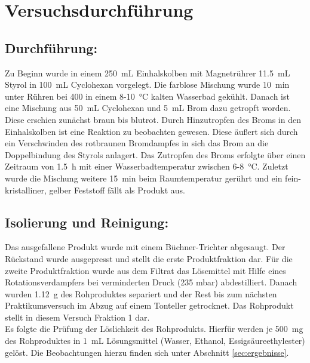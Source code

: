 \newpage
\section{Versuchsdurchführung}
\label{sec:durchfuerung}


\subsection*{Durchführung:}
Zu Beginn wurde in einem \SI{250}{\milli \liter} Einhalskolben mit Magnetrührer \SI{11,5}{\milli \liter} Styrol in \SI{100}{\milli \liter} Cyclohexan vorgelegt. Die farblose Mischung wurde \SI{10}{\minute} unter Rühren bei \SI{400}{\rpm} in einem 8-\SI{10}{\celsius} kalten Wasserbad gekühlt. Danach ist eine Mischung aus \SI{50}{\milli \liter} Cyclohexan und \SI{5}{\milli \liter} Brom dazu getropft worden. Diese erschien zunächst braun bis blutrot. Durch Hinzutropfen des Broms in den Einhalskolben ist eine Reaktion zu beobachten gewesen. Diese äußert sich durch ein Verschwinden des rotbraunen Bromdampfes in sich das Brom an die Doppelbindung des Styrols anlagert. Das Zutropfen des Broms erfolgte über einen Zeitraum von \SI{1,5}{\hour} mit einer Wasserbadtemperatur zwischen 6-\SI{8}{\celsius}. Zuletzt wurde die Mischung weitere \SI{15}{\minute} beim Raumtemperatur gerührt und ein fein-kristalliner, gelber Feststoff fällt als Produkt aus.

\subsection*{Isolierung und Reinigung:}

Das ausgefallene Produkt wurde mit einem Büchner-Trichter abgesaugt. Der
Rückstand wurde ausgepresst und stellt die erste Produktfraktion dar. Für die
zweite Produktfraktion wurde aus dem Filtrat das Lösemittel mit Hilfe eines
Rotationsverdampfers bei verminderten Druck (235 mbar) abdestilliert.
Danach wurden \SI{1,12}{\gram} des Rohproduktes separiert und der Rest bis zum nächsten Praktikumsversuch im Abzug auf einem Tonteller getrocknet. Das Rohprodukt stellt in diesem Versuch Fraktion 1 dar.\\
Es folgte die Prüfung der Löslichkeit des Rohprodukts. Hierfür werden je \SI{500}{\milli \gram} des Rohproduktes in \SI{1}{\milli \liter} Lösungsmittel (Wasser, Ethanol, Essigsäureethylester) gelöst. Die Beobachtungen hierzu finden sich unter Abschnitt \ref{sec:ergebnisse}.

